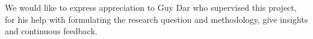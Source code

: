 We would like to express appreciation to Guy Dar who supervised this project, for his help with formulating the research question and methodology, give insights and continuous feedback.